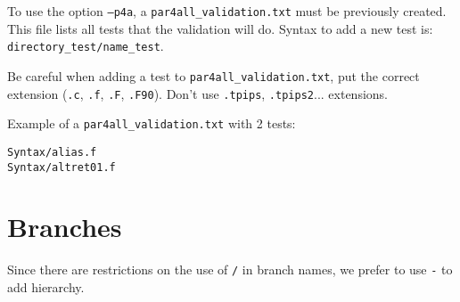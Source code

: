\documentclass[a4paper]{article}
\begin{document}
To use the option \texttt{--p4a}, a \verb|par4all_validation.txt| must be
previously created. This file lists all tests that the validation will do.
Syntax to add a new test is: \verb|directory_test/name_test|.

Be careful when adding a test to \verb|par4all_validation.txt|, put the
correct extension (\texttt{.c}, \texttt{.f}, \texttt{.F},
\texttt{.F90}). Don't use \texttt{.tpips}, \texttt{.tpips2}... extensions.

Example of a \verb|par4all_validation.txt| with 2 tests:
\begin{verbatim}
Syntax/alias.f
Syntax/altret01.f
\end{verbatim}


\section{Branches}
\label{sec:branches}

Since there are restrictions on the use of \texttt{/} in branch names, we
prefer to use \texttt{-} to add hierarchy.
\end{document}
